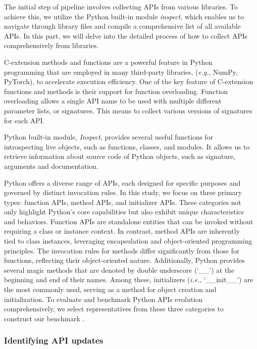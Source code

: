 The initial step of \method pipeline involves collecting APIs from various libraries. To achieve this, we utilize the Python built-in module \textit{inspect}, which enables us to navigate through library files and compile a comprehensive list of all available APIs. In this part, we will delve into the detailed process of how to collect APIs comprehensively from libraries.

 C-extension methods and functions are a powerful feature in Python programming that are employed in many third-party libraries, (\emph{e.g.}, NumPy, PyTorch), to accelerate execution efficiency. One of the key feature of C-extension functions and methods is their support for function overloading. Function overloading allows a single API name to be used with multiple different parameter lists, or signatures. This means to collect various versions of signatures for each API.

 Python built-in module, \textit{Inspect}, provides several useful functions for introspecting live objects, such as functions, classes, and modules. It allows us to retrieve information about source code of Python objects, such as signature, arguments and documentation. 

 Python offers a diverse range of APIs, each designed for specific purposes and governed by distinct invocation rules. In this study, we focus on three primary types: function APIs, method APIs, and initializer APIs. 
These categories not only highlight Python's core capabilities but also exhibit unique characteristics and behaviors. Function APIs are standalone entities that can be invoked without requiring a class or instance context. In contrast, method APIs are inherently tied to class instances, leveraging encapsulation and object-oriented programming principles. The invocation rules for methods differ significantly from those for functions, reflecting their object-oriented nature. Additionally, Python provides several magic methods that are denoted by double underscore (`\_\_') at the beginning and end of their names. Among these, initializers (\emph{i.e.}, `\_\_init\_\_') are the most commonly used, serving as a method for object creation and initialization. To evaluate and benchmark Python APIs evolution comprehensively, we select representatives from these three categories to construct our benchmark \benchmark.

\subsubsection{Identifying API updates}
\label{appx_api_update_identification}

